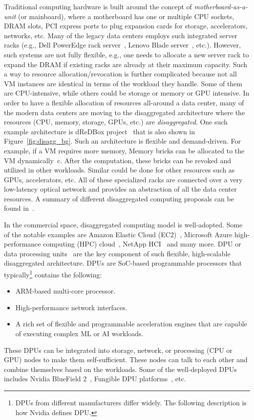 Traditional computing hardware is built around the concept of \emph{motherboard-as-a-unit} (or mainboard), where a motherboard has one or multiple CPU sockets, DRAM slots, PCI express ports to plug expansion cards for storage, accelerators, networks, etc. Many of the legacy data centers employs such integrated server racks  (e.g., Dell PowerEdge rack server~\cite{rack_server_dell}, Lenovo Blade server~\cite{rack_server_lenovo}, etc.). However, such systems are not fully flexible, e.g., one needs to allocate a new server rack to expand the DRAM if existing racks are already at their maximum capacity. Such a way to resource allocation/revocation is further complicated because not all VM instances are identical in terms of the workload they handle. Some of them are CPU-intensive, while others could be storage or memory or GPU intensive. In order to have a flexible allocation of resources all-around a data center, many of the modern data centers are moving to the disaggregated architecture where the resources (CPU, memory, storage, GPUs, etc.) are \emph{disaggregated}. One such example architecture is dReDBox project~\cite{dis1,dis2} that is also shown in Figure~\ref{fig:disagg_bg}. Such an architecture is flexible and demand-driven. For example, if a VM requires more memory, Memory bricks can be allocated to the VM dynamically~c\cite{lim2009disaggregated}. After the computation, these bricks can be revoked and utilized in other workloads. Similar could be done for other resources such as GPUs, accelerators, etc. All of these specialized racks are connected over a very low-latency optical network and provides an abstraction of all the data center resources. A summary of different disaggregated computing proposals can be found in~\cite{meyer2017disaggregated}.

In the commercial space, disaggregated computing model is well-adopted. Some of the notable examples are Amazon Elastic Cloud (EC2)~\cite{ec2}, Microsoft Azure high-performance computing (HPC) cloud~\cite{azure}, NetApp HCI~\cite{netapp} and many more. DPU or data processing units~\cite{dpu} are the key component of such flexible, high-scalable disaggregated architecture. DPUs are SoC-based programmable processors that typically\footnote{DPUs from different manufacturers differ widely. The following description is how Nvidia defines DPU.} contains the following:

\begin{itemize}
  \item ARM-based multi-core processor.
  \item High-performance network interfaces. 
  \item A rich set of flexible and programmable acceleration engines that are capable of executing complex ML or AI workloads.
\end{itemize}

These DPUs can be integrated into storage, network, or processing (CPU or GPU) nodes to make them self-sufficient. These nodes can talk to each other and combine themselves based on the workloads. Some of the well-deployed DPUs includes Nvidia BlueField 2~\cite{bluefield}, Fungible DPU platforms~\cite{fungible}, etc.